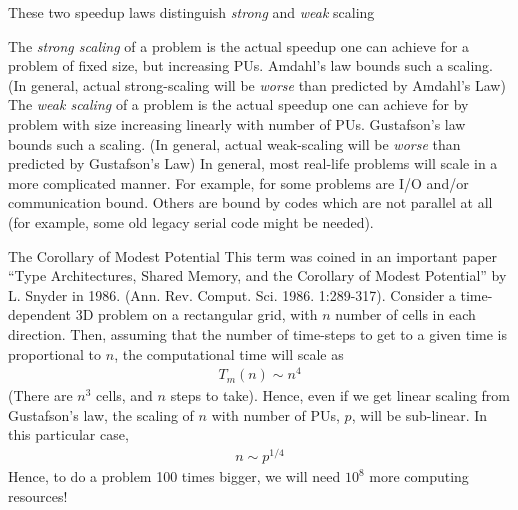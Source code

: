 \documentclass[aspectratio=169]{beamer}
\newcommand{\mypause}{\pause}
\begin{document}
\begin{frame}{These two speedup laws distinguish \emph{strong} and
    \emph{weak} scaling}

  The \emph{strong scaling} of a problem is the actual speedup one can
  achieve for a problem of fixed size, but increasing PUs. Amdahl's
  law bounds such a scaling. (In general, actual strong-scaling will
  be \emph{worse} than predicted by Amdahl's Law)%
  \mypause%
  \vskip0.1in%
  The \emph{weak scaling} of a problem is the actual speedup one can
  achieve for by problem with size increasing linearly with number of
  PUs. Gustafson's law bounds such a scaling. (In general, actual
  weak-scaling will be \emph{worse} than predicted by Gustafson's
  Law)%
  \mypause%
  \vskip0.1in%
  In general, most real-life problems will scale in a more complicated
  manner. For example, for some problems are I/O and/or communication
  bound. Others are bound by codes which are not parallel at all (for
  example, some old legacy serial code might be needed).

\end{frame}

\begin{frame}{The Corollary of Modest Potential}
  This term was coined in an important paper ``Type Architectures,
  Shared Memory, and the Corollary of Modest Potential'' by L. Snyder
  in 1986. (Ann. Rev. Comput. Sci. 1986. 1:289-317).%
  \vskip0.1in%
  Consider a time-dependent 3D problem on a rectangular grid, with $n$
  number of cells in each direction. Then, assuming that the number of
  time-steps to get to a given time is proportional to $n$, the
  computational time will scale as
  \begin{align*}
    T_m(n) \sim n^4
  \end{align*}
  (There are $n^3$ cells, and $n$ steps to take). Hence, even if we
  get linear scaling from Gustafson's law, the scaling of $n$ with
  number of PUs, $p$, will be sub-linear. In this particular case,
  \begin{align*}
    n \sim p^{1/4}
  \end{align*}
  {\color{blue} Hence, to do a problem 100 times bigger, we will need
    $10^8$ more computing resources!}%
\end{frame}
\end{document}
